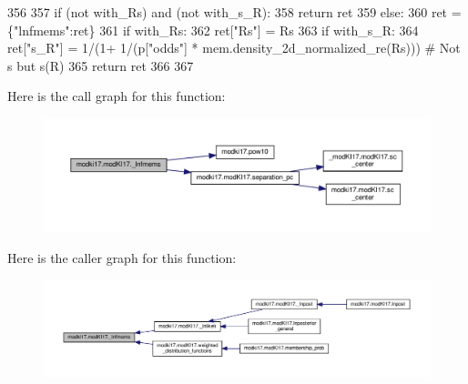 \begin{DoxyCode}
356         
357         \textcolor{keywordflow}{if} (\textcolor{keywordflow}{not} with\_Rs) \textcolor{keywordflow}{and} (\textcolor{keywordflow}{not} with\_s\_R):
358             \textcolor{keywordflow}{return} ret
359         \textcolor{keywordflow}{else}:
360             ret = \{\textcolor{stringliteral}{"lnfmems"}:ret\}
361             \textcolor{keywordflow}{if} with\_Rs:
362                 ret[\textcolor{stringliteral}{"Rs"}] = Rs
363             \textcolor{keywordflow}{if} with\_s\_R:
364                 ret[\textcolor{stringliteral}{"s\_R"}] = 1/(1+ 1/(p[\textcolor{stringliteral}{"odds"}] * mem.density\_2d\_normalized\_re(Rs))) \textcolor{comment}{# Not s but s(R)}
365             \textcolor{keywordflow}{return} ret
366     
367     
\end{DoxyCode}
Here is the call graph for this function\+:\nopagebreak
\begin{figure}[H]
\begin{center}
\leavevmode
\includegraphics[width=350pt]{df/da3/classmodki17_1_1modKI17_af86144a3ec43facf835be07b718d9560_cgraph}
\end{center}
\end{figure}
Here is the caller graph for this function\+:\nopagebreak
\begin{figure}[H]
\begin{center}
\leavevmode
\includegraphics[width=350pt]{df/da3/classmodki17_1_1modKI17_af86144a3ec43facf835be07b718d9560_icgraph}
\end{center}
\end{figure}
\mbox{\label{classmodki17_1_1modKI17_a54b0d8abd39c0ab4c04cb1e52eafe9c5}} 
